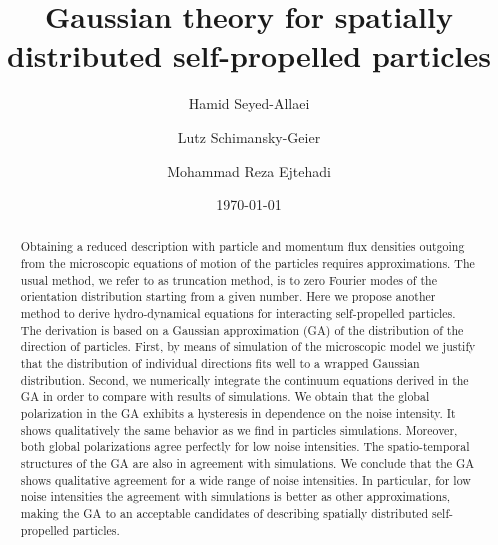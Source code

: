 \documentclass[reprint,floatfix,amsmath,amssymb,aps,pre,showkeys,showpacs,superscriptaddress]{revtex4-1}
\begin{document}
\title{Gaussian theory for spatially distributed self-propelled particles}

\date{\today}

\author{Hamid Seyed-Allaei}
\author{Lutz Schimansky-Geier}
\author{Mohammad Reza Ejtehadi}

\begin{abstract}
Obtaining a reduced description with particle and momentum flux densities outgoing from the microscopic equations of motion of the particles requires approximations. The usual method, we refer to as truncation method, is to zero Fourier modes of the orientation distribution starting from a given number. Here we propose another method to derive hydro-dynamical equations for interacting self-propelled particles. The derivation is based on a Gaussian approximation (GA) of the distribution of the direction of particles. First, by means of simulation of the microscopic model we justify that the distribution of individual directions fits well to a wrapped Gaussian distribution. Second, we numerically integrate the continuum equations derived in the GA in order to compare with results of simulations. We obtain that the global polarization in the GA exhibits a hysteresis in dependence on the noise intensity. It shows qualitatively the same behavior as we find  in particles simulations. Moreover, both global polarizations agree perfectly for low noise intensities. The spatio-temporal structures of the GA are also in agreement with simulations. We conclude that the GA shows qualitative agreement  for a wide range of noise
intensities. In particular, for low noise intensities the agreement with  simulations is better as other approximations, making  the GA to an acceptable candidates of describing spatially distributed self-propelled particles.
\end{abstract}


\maketitle
\end{document}
